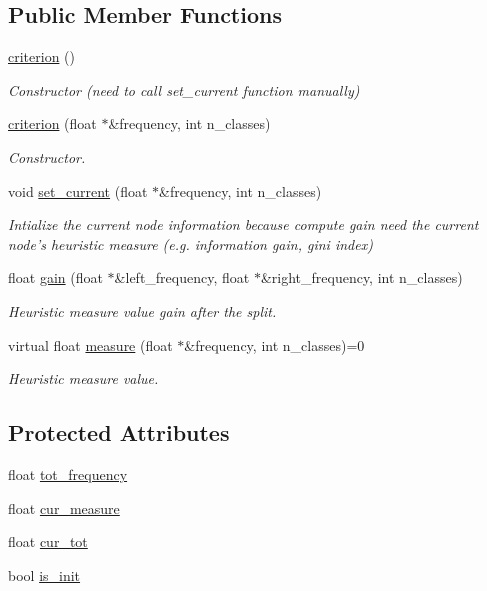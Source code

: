 \subsection*{Public Member Functions}
\begin{DoxyCompactItemize}
\item 
\hyperlink{classcriterion_a5047629e45833624bc6955cc0dd106b8}{criterion} ()
\begin{DoxyCompactList}\small\item\em Constructor (need to call {\ttfamily set\+\_\+current} function manually) \end{DoxyCompactList}\item 
\hyperlink{classcriterion_acf80c0b2acf9fb6f2b8369868cafdbff}{criterion} (float $\ast$\&frequency, int n\+\_\+classes)
\begin{DoxyCompactList}\small\item\em Constructor. \end{DoxyCompactList}\item 
void \hyperlink{classcriterion_a043c2105b2cfc256cb530c55b65156f2}{set\+\_\+current} (float $\ast$\&frequency, int n\+\_\+classes)
\begin{DoxyCompactList}\small\item\em Intialize the current node information because compute {\ttfamily gain} need the current node's heuristic measure (e.\+g. information gain, gini index) \end{DoxyCompactList}\item 
float \hyperlink{classcriterion_a8d42878c94bae5a72475b568bcbbddfa}{gain} (float $\ast$\&left\+\_\+frequency, float $\ast$\&right\+\_\+frequency, int n\+\_\+classes)
\begin{DoxyCompactList}\small\item\em Heuristic measure value gain after the split. \end{DoxyCompactList}\item 
virtual float \hyperlink{classcriterion_a1fbda0723578acd5ac612248a54ba71d}{measure} (float $\ast$\&frequency, int n\+\_\+classes)=0
\begin{DoxyCompactList}\small\item\em Heuristic measure value. \end{DoxyCompactList}\end{DoxyCompactItemize}
\subsection*{Protected Attributes}
\begin{DoxyCompactItemize}
\item 
float \hyperlink{classcriterion_ac226599a3e6e160614d3698193053368}{tot\+\_\+frequency}
\item 
float \hyperlink{classcriterion_af8e6efc16000b83cffb9e0864bf68561}{cur\+\_\+measure}
\item 
float \hyperlink{classcriterion_aa89bec3e37cd874b3590887038712c54}{cur\+\_\+tot}
\item 
bool \hyperlink{classcriterion_a5f3c4708d9e6a9120ec8b8d98c73ff47}{is\+\_\+init}
\end{DoxyCompactItemize}


